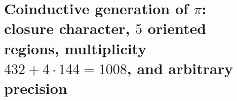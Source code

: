 \chapter{Coinductive generation of \(\pi\): closure character, \(5\) oriented regions, multiplicity \(432+4\cdot144=1008\), and arbitrary precision}
\label{chap:p3-final:28:generacion_pi}


